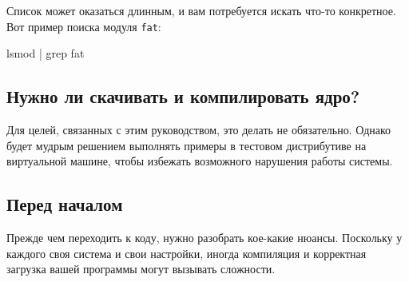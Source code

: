 \documentclass[10pt, oneside]{book}
\begin{document}
Список может оказаться длинным, и вам потребуется искать что-то конкретное. Вот пример поиска модуля
\verb|fat|:
\begin{codebash}
lsmod | grep fat
\end{codebash}

\subsection{Нужно ли скачивать и компилировать ядро?}
\label{sec:buildkernel}
Для целей, связанных с этим руководством, это делать не обязательно. Однако будет мудрым решением выполнять примеры в тестовом дистрибутиве на виртуальной машине, чтобы избежать возможного нарушения работы системы.

\subsection{Перед началом}
\label{sec:preparation}
Прежде чем переходить к коду, нужно разобрать кое-какие нюансы. Поскольку у каждого своя система и свои настройки, иногда компиляция и корректная загрузка вашей программы могут вызывать сложности.
\end{document}
